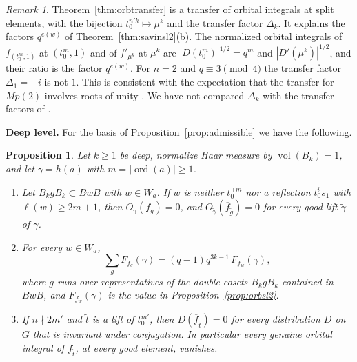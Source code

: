 \documentclass[12pt,letterpaper]{amsart}
\numberwithin{equation}{section}
\newtheorem{proposition}[theorem]{Proposition}
\theoremstyle{definition}
\theoremstyle{remark}
\newtheorem{remark}[theorem]{Remark}
\DeclareMathOperator{\vol}{vol}
\DeclareMathOperator{\ord}{ord}
\newcommand{\Gbar}{\overline{G}}
\newcommand{\fbar}{\overline{f}}
\begin{document}
\begin{remark}
\label{rem:orbmeaning}
Theorem~\ref{thm:orbtransfer} is a transfer of orbital integrals at
split elements, with the bijection $t_0^{n'k}\mapsto\mu^k$ and the
transfer factor $\Delta_k$. It explains the factors $q^{e(w)}$ of
Theorem~\ref{thm:savinsl2}(b). The normalized orbital integrals of
$\fbar_{(t_0^m,1)}$ at $(t_0^m,1)$ and of $f'_{\mu^k}$ at $\mu^k$ are
$|D(t_0^m)|^{1/2}=q^m$ and $|D'(\mu^k)|^{1/2}$, and their ratio is the
factor $q^{e(w)}$. For $n=2$ and $q\equiv 3\pmod4$ the transfer factor
$\Delta_1=-i$ is not $1$. This is consistent with the expectation that
the transfer for $Mp(2)$ involves roots of unity \cite{Li11}. We have not
compared $\Delta_k$ with the transfer factors of \cite{Li11}.
\end{remark}

\medskip\noindent\textbf{Deep level.} For the basis of
Proposition~\ref{prop:admissible} we have the following.

\begin{proposition}
\label{prop:orbdeep}
Let $k\geq1$ be deep, normalize Haar measure by $\vol(B_k)=1$, and let
$\gamma=h(a)$ with $m=|\ord(a)|\geq1$.
\begin{enumerate}[leftmargin=2em,label=(\alph*)]
\item Let $B_kgB_k\subset BwB$ with $w\in W_a$. If $w$ is neither
$t_0^{\pm m}$ nor a reflection $t_0^is_1$ with $\ell(w)\geq 2m+1$, then
$O_\gamma(f_g)=0$, and $O_{\tilde\gamma}(\fbar_{\tilde g})=0$ for
every good lift $\tilde\gamma$ of $\gamma$.
\item For every $w\in W_a$,
\[
\sum_gF_{f_g}(\gamma)=(q-1)q^{3k-1}\,F_{f_w}(\gamma),
\]
where $g$ runs over representatives of the double cosets $B_kgB_k$
contained in $BwB$, and $F_{f_w}(\gamma)$ is the value in
Proposition~\ref{prop:orbsl2}.
\item If $n\nmid 2m'$ and $\tilde t$ is a lift of $t_0^{m'}$, then
$D(\fbar_{\tilde t})=0$ for every distribution $D$ on $\Gbar$ that is
invariant under conjugation. In particular every genuine orbital
integral of $\fbar_{\tilde t}$, at every good element, vanishes.
\end{enumerate}
\end{proposition}
\end{document}
